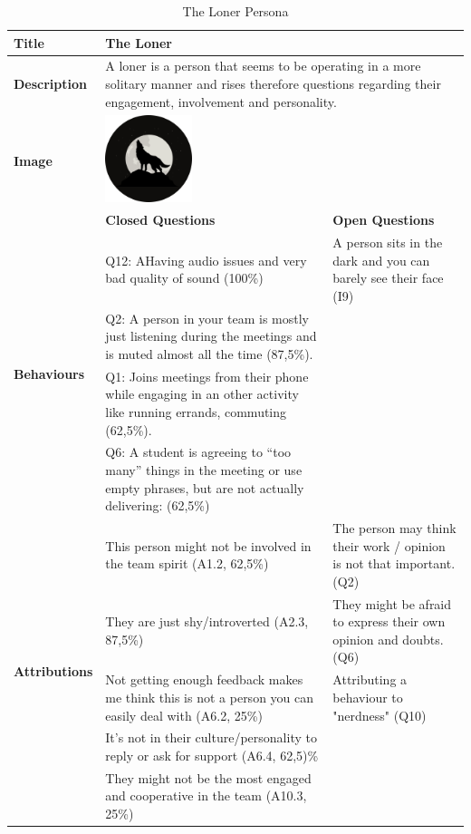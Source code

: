 \begin{longtable}[ht]{ p{}  p{} p{} }
\caption{The Loner Persona}
\label{tab:theLoner}\\
\hline
\textbf{Title} & The Loner \\
    \hline
   \textbf{Description} & \multicolumn{2}{p{.80\textwidth}}{A loner is a person that seems to be operating in a more solitary manner and rises therefore questions regarding their engagement, involvement and personality.} \\
\hline
   \textbf{Image} &  \includegraphics[valign=t, width=1in, margin=0pt 3pt 0pt 3pt]{figures/Loner.png} \\   
   \hline
    & \textbf{Closed Questions} & \textbf{Open Questions} \\
    \hline
    \multirow{4}{4cm}{\textbf{Behaviours}}  & Q12: AHaving audio issues and very bad quality of sound (100\%) & A person sits in the dark and you can barely see their face (I9) \\
     & Q2: A person in your team is mostly just listening during the meetings and is muted almost all the time (87,5\%). \\
     & Q1: Joins meetings from their phone while engaging in an other activity like running errands, commuting (62,5\%). \\
 	 & Q6: A student is agreeing to “too many” things in the meeting or use empty phrases, but are not actually delivering: (62,5\%)  \\
    \hline
    \multirow{6}{4cm}{\textbf{Attributions}}  & This person might not be involved in the team spirit (A1.2, 62,5\%) & The person may think their work / opinion is not that important. (Q2)  \\
     & They are just shy/introverted (A2.3, 87,5\%) & They might be afraid to express their own opinion and doubts. (Q6) \\
     & Not getting enough feedback makes me think this is not a person you can easily deal with (A6.2, 25\%) & Attributing a behaviour to "nerdness" (Q10) \\
     & It’s not in their culture/personality to reply or ask for support  (A6.4, 62,5)\%\\
 	 & They might not be the most engaged and cooperative in the team (A10.3, 25\%) \\

\end{longtable}
